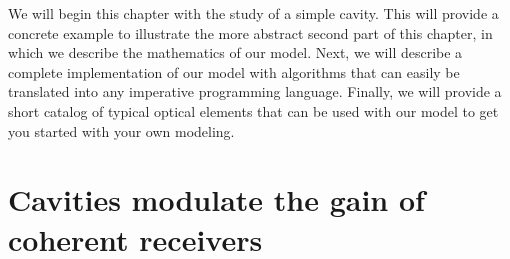 We will begin this chapter with the study of a simple cavity.
This will provide a concrete example to illustrate the more abstract second part of this chapter, in which we describe the mathematics of our model.
Next, we will describe a complete implementation of our model with algorithms that can easily be translated into any imperative programming language.
Finally, we will provide a short catalog of typical optical elements that can be used with our model to get you started with your own modeling.





\FloatBarrier


\section{Cavities modulate the gain of coherent receivers}
\label{sec:from_cavity_to_ripple}
\label{sec:fabry_perot_example}

